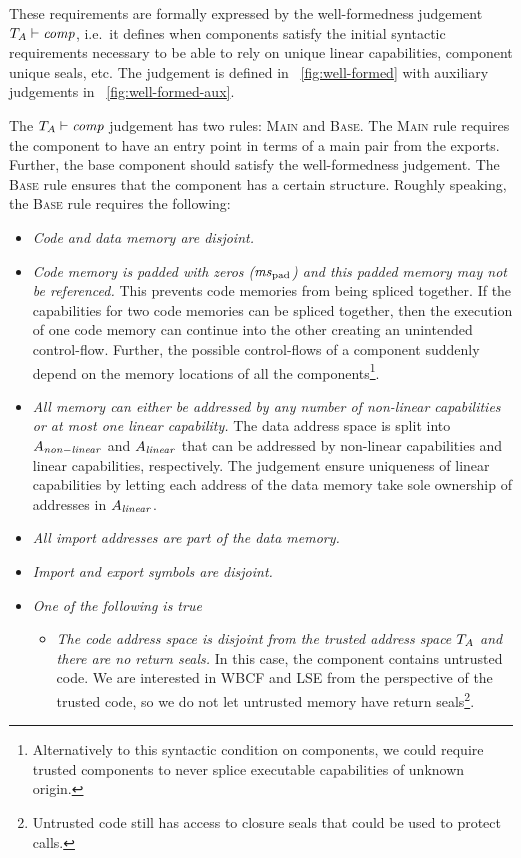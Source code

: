\documentclass[acmsmall,screen]{acmart}\settopmatter{}
\renewcommand{\comp}{\var{comp}}
\newcommand{\wdjud}[2][ ]{#1 \vdash #2}
\newenvironment{jversion}%
    {\color{OliveGreen}}{}
\begin{document}
\begin{jversion}
These requirements are formally expressed by the well-formedness judgement $\wdjud[\ta]{\comp}$, i.e.\ it defines when components satisfy the initial syntactic requirements necessary to be able to rely on unique linear capabilities, component unique seals, etc.
The judgement is defined in \figurename~\ref{fig:well-formed} with auxiliary judgements in \figurename~\ref{fig:well-formed-aux}.

The $\wdjud[\ta]{\comp}$ judgement has two rules: \textsc{Main} and \textsc{Base}.
The \textsc{Main} rule requires the component to have an entry point in terms of a main pair from the exports.
Further, the base component should satisfy the well-formedness judgement.
The \textsc{Base} rule ensures that the component has a certain structure.
Roughly speaking, the \textsc{Base} rule requires the following:
\begin{itemize}
\item \textit{Code and data memory are disjoint.}
\item \textit{Code memory is padded with zeros ($\mspad$) and this padded memory may not be referenced.}
  This prevents code memories from being spliced together.
  If the capabilities for two code memories can be spliced together, then the execution of one code memory can continue into the other creating an unintended control-flow.
  Further, the possible control-flows of a component suddenly depend on the memory locations of all the components\footnote{Alternatively to this syntactic condition on components, we could require trusted components to never splice executable capabilities of unknown origin.}.
\item \textit{All memory can either be addressed by any number of non-linear capabilities or at most one linear capability.}
  The data address space is split into $A_{\mathit{non-linear}}$ and $A_{\mathit{linear}}$ that can be addressed by non-linear capabilities and linear capabilities, respectively.
  The judgement ensure uniqueness of linear capabilities by letting each address of the data memory take sole ownership of addresses in $A_{\mathit{linear}}$.
\item \textit{All import addresses are part of the data memory.} 
\item \textit{Import and export symbols are disjoint.}
\item \textit{One of the following is true}
  \begin{itemize}
  \item \textit{The code address space is disjoint from the trusted address space $T_{A}$ and there are no return seals.} In this case, the component contains untrusted code. We are interested in WBCF and LSE from the perspective of the trusted code, so we do not let untrusted memory have return seals\footnote{Untrusted code still has access to closure seals that could be used to protect calls.}.

\end{itemize}
\end{itemize}
\end{jversion}
\end{document}

